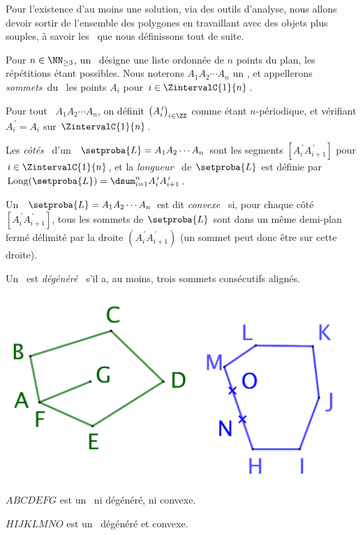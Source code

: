 Pour l'existence d'au moins une solution, via des outils d'analyse, nous allons devoir sortir de l'ensemble des polygones en travaillant avec des objets plus souples, à savoir les \ncycles\ que nous définissons tout de suite.




\begin{defi}
	Pour $n \in \NN_{\geq3}$, un \og \emph{\ncycle} \fg\ désigne une liste ordonnée de $n$ points du plan, les répétitions étant possibles.
	Nous noterons $A_1 A_2 \cdots A_n$ un \ncycle, et appellerons \og \emph{sommets}\fg\ du \ncycle\ les points $A_i$ pour $i \in \ZintervalC{1}{n}$.
\end{defi}


\begin{defi}
    Pour tout \ncycle\ $A_1 A_2 \cdots A_n$, on définit $\big( A^{\,\prime}_i \big)_{i \in \ZZ}$ comme étant $n$-périodique, et vérifiant $A^{\,\prime}_{i} = A_i$ sur $\ZintervalC{1}{n}$.
\end{defi}


\begin{defi}
	Les \og \emph{côtés} \fg\ d'un \ncycle\ $\setproba{L} = A_1 A_2 \cdots A_n$ sont les segments
	$[A^{\,\prime}_i A^{\,\prime}_{i+1}]$ pour $i \in \ZintervalC{1}{n}$,
	et
	la \og \emph{longueur} \fg\ de $\setproba{L}$ est définie par $\cyclelen{\setproba{L}} = \dsum_{i=1}^{n} A^{\,\prime}_i A^{\,\prime}_{i+1}$.
\end{defi}


\begin{defi}
	Un \ncycle\ $\setproba{L} = A_1 A_2 \cdots A_n$ est dit \og \emph{convexe} \fg\ si, pour chaque côté $[A^{\,\prime}_i A^{\,\prime}_{i+1}]$, tous les sommets de $\setproba{L}$ sont dans un même demi-plan fermé délimité par la droite $(A^{\,\prime}_i A^{\,\prime}_{i+1})$ (un sommet peut donc être sur cette droite).
\end{defi}


\begin{defi}
	Un \ncycle\ est \og \emph{dégénéré} \fg\ s'il a, au moins, trois sommets consécutifs alignés.
\end{defi}


\begin{center}
	\small\itshape\centering
	\includegraphics[scale=.35]{content/polygon/def/degenerated-ncycles.png}
	
	\smallskip
	$ABCDEFG$ est un \ncycle\ ni dégénéré, ni convexe.
	
	\smallskip
	$HIJKLMNO$ est un \ncycle\ dégénéré et convexe.
\end{center}


